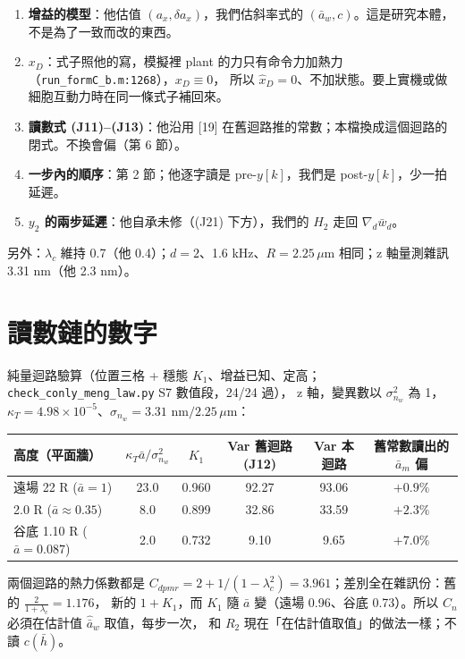 \documentclass[11pt,a4paper]{ctexart}
\newcommand{\ba}{\bar{a}}
\newcommand{\bw}{\bar{w}}
\newcommand{\ah}{\hat{\ba}_w}
\newcommand{\lc}{\lambda_c}
\begin{document}
\begin{enumerate}
\item \textbf{增益的模型}：他估值 $(a_x, \delta a_x)$，我們估斜率式的 $(\ba_w, c)$。這是研究本體，不是為了一致而改的東西。
\item \textbf{$x_D$}：式子照他的寫，模擬裡 plant 的力只有命令力加熱力（\texttt{run\_formC\_b.m:1268}），$x_D \equiv 0$，
      所以 $\hat x_D = 0$、不加狀態。要上實機或做細胞互動力時在同一條式子補回來。
\item \textbf{讀數式 (J11)--(J13)}：他沿用 [19] 在舊迴路推的常數；本檔換成這個迴路的閉式。不換會偏（第 6 節）。
\item \textbf{一步內的順序}：第 2 節；他逐字讀是 pre-$y[k]$，我們是 post-$y[k]$，少一拍延遲。
\item \textbf{$y_2$ 的兩步延遲}：他自承未修（(J21) 下方），我們的 $H_2$ 走回 $\nabla_d\bw_d$。
\end{enumerate}
另外：$\lc$ 維持 0.7（他 0.4）；$d = 2$、1.6 kHz、$R = 2.25\,\mu$m 相同；z 軸量測雜訊 3.31 nm（他 2.3 nm）。

\section{讀數鏈的數字}

純量迴路驗算（位置三格 + 穩態 $K_1$、增益已知、定高；\texttt{check\_conly\_meng\_law.py} S7 數值段，24/24 過），
z 軸，變異數以 $\sigma^2_{n_w}$ 為 1，$\kappa_T = 4.98\times10^{-5}$、$\sigma_{n_w} = 3.31$ nm$/2.25\,\mu$m：

{\small
\begin{tabular}{@{}lccccc@{}}
\toprule
高度（平面牆） & $\kappa_T\ba/\sigma^2_{n_w}$ & $K_1$ & Var 舊迴路 (J12) & Var 本迴路 & 舊常數讀出的 $\ba_m$ 偏 \\
\midrule
遠場 22 R ($\ba = 1$) & 23.0 & 0.960 & 92.27 & 93.06 & $+0.9\%$ \\
2.0 R ($\ba \approx 0.35$) & 8.0 & 0.899 & 32.86 & 33.59 & $+2.3\%$ \\
谷底 1.10 R ($\ba = 0.087$) & 2.0 & 0.732 & 9.10 & 9.65 & $+7.0\%$ \\
\bottomrule
\end{tabular}}

兩個迴路的熱力係數都是 $C_{dpmr} = 2 + 1/(1-\lc^2) = 3.961$；差別全在雜訊份：舊的 $\tfrac{2}{1+\lc} = 1.176$，
新的 $1 + K_1$，而 $K_1$ 隨 $\ba$ 變（遠場 0.96、谷底 0.73）。所以 $C_n$ 必須在估計值 $\ah$ 取值，每步一次，
和 $R_2$ 現在「在估計值取值」的做法一樣；不讀 $c(\bar h)$。
\end{document}
